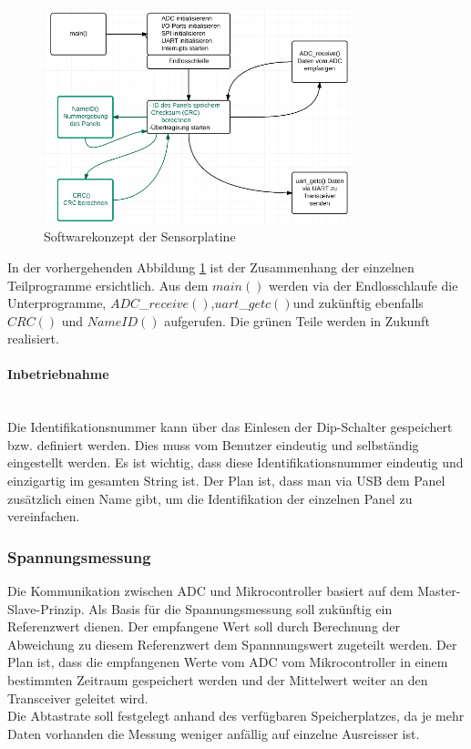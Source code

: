 \begin{figure}[htb]
\centering
\includegraphics[width=0.8\textwidth]{sections/data/Sensorplatine}
\caption{Softwarekonzept der Sensorplatine}
\label{DiagrammSP}
\end{figure}

In der vorhergehenden Abbildung \ref{DiagrammSP} ist der Zusammenhang der einzelnen Teilprogramme ersichtlich. Aus dem $main()$ werden via der Endlosschlaufe die Unterprogramme, $ADC$\_$receive()$,$uart$\_$getc()$und zukünftig ebenfalls $CRC()$ und $NameID()$ aufgerufen. Die grünen Teile werden in Zukunft realisiert.\\

\paragraph{Inbetriebnahme}\\
Die Identifikationsnummer kann über das Einlesen der Dip-Schalter gespeichert bzw. definiert werden. Dies muss vom Benutzer eindeutig und selbständig eingestellt werden. Es ist wichtig, dass diese Identifikationsnummer eindeutig und einzigartig im gesamten String ist. Der Plan ist, dass man via USB dem Panel zusätzlich einen Name gibt, um die Identifikation der einzelnen Panel zu vereinfachen. 

\subsubsection{Spannungsmessung}\label{Spannungsmessung}
Die Kommunikation zwischen ADC und Mikrocontroller basiert auf dem Master-Slave-Prinzip. 
Als Basis für die Spannungsmessung soll zukünftig ein Referenzwert dienen. Der empfangene Wert soll durch Berechnung der Abweichung zu diesem Referenzwert dem Spannnungswert zugeteilt werden. Der Plan ist, dass die empfangenen Werte vom ADC vom Mikrocontroller in einem bestimmten Zeitraum gespeichert werden und der Mittelwert weiter an den Transceiver geleitet wird.\\ Die Abtastrate soll  festgelegt anhand des verfügbaren Speicherplatzes, da je mehr Daten vorhanden die Messung weniger anfällig auf einzelne Ausreisser ist. 

